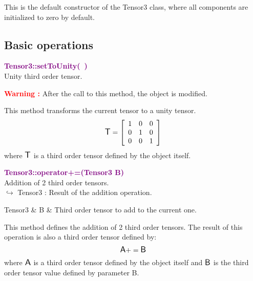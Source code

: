 This is the default constructor of the Tensor3 class, where all components are initialized to zero by default.

\subsection{Basic operations}

\textcolor{purple}{\textbf{Tensor3::setToUnity(~)}}\label{Tensor3::setToUnity()}\\
Unity third order tensor.

\hspace*{10mm}\textcolor{red}{\textbf{Warning :}} After the call to this method, the object is modified.

This method transforms the current tensor to a unity tensor.
\begin{equation*}
\mbox{\large\ensuremath{\mathsf{T}}}=\left[\begin{array}{ccc}
1&0&0\\
0&1&0\\
0&0&1
\end{array}\right]
\end{equation*}
where $\mbox{\large\ensuremath{\mathsf{T}}}$ is a third order tensor defined by the object itself.

\textcolor{purple}{\textbf{Tensor3::operator+=(Tensor3 B)}}\label{Tensor3::operator+=(Tensor3 B)}\\
Addition of 2 third order tensors.\\ \hspace*{10mm}$\hookrightarrow$ Tensor3 : Result of the addition operation.

\begin{tcolorbox}[width=\textwidth,myArgs,tabularx={ll|R}]
Tensor3 & B & Third order tensor to add to the current one.
\end{tcolorbox}

This method defines the addition of 2 third order tensors.
The result of this operation is also a third order tensor defined by:
\begin{equation*}
\mbox{\large\ensuremath{\mathsf{A}}} += \mbox{\large\ensuremath{\mathsf{B}}}
\end{equation*}
where $\mbox{\large\ensuremath{\mathsf{A}}}$ is a third order tensor defined by the object itself and $\mbox{\large\ensuremath{\mathsf{B}}}$ is the third order tensor value defined by parameter B.

